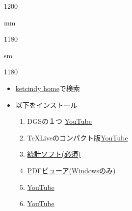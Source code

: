 \documentclass[landscape,10pt]{jarticle}
\newcommand{\slidepage}[1][s]{%
\setcounter{ketpicctra}{18}%
\if#1m \setcounter{ketpicctra}{1}\fi
\hypersetup{linkcolor=black}%

\begin{layer}{118}{0}
\putnotee{122}{-\theketpicctra.05}{\small\thepage/\pageref{pageend}}
\end{layer}\hypersetup{linkcolor=blue}

}
\begin{document}
\begin{layer}{120}{0}
\end{layer}

\def\mainslidetitley{22}
\def\ketcletter{slidecolora}
\def\ketcbox{slidecolorb}
\def\ketdbox{slidecolorc}
\def\ketcframe{slidecolord}
\def\ketcshadow{slidecolore}
\def\ketdshadow{slidecolorf}
\def\slidetitlex{6}
\def\slidetitlesize{1.3}
\def\mketcletter{slidecolori}
\def\mketcbox{yellow}
\def\mketdbox{yellow}
\def\mketcframe{yellow}
\def\mslidetitlex{62}
\def\mslidetitlesize{2}

\color{black}
\Large\bf\boldmath
\addtocounter{page}{-1}





\slidepage[m]



\vspace*{18mm}

\slidepage
\begin{itemize}
\item
\href{https://s-takato.github.io/ketcindyorg/indexj.html}{ketcindy home}で検索\vspace{-2mm}
\item
以下をインストール\vspace{-2mm}
\begin{enumerate}[(1)]
\item
{}DGSの１つ \href{https://www.youtube.com/watch?v=eAdhjGW438I}{YouTube}\vspace{-2mm}
\item
{}TeXLiveのコンパクト版\href{https://www.youtube.com/watch?v=_6zPk-3sAP8}{YouTube}\vspace{-2mm}
\item
{}\href{https://cran.r-project.org}{統計ソフト(必須)}\vspace{-2mm}
\item
{}\href{https://cran.r-project.org}{PDFビューア(Windowsのみ)}\vspace{-2mm}
\item
{}\href{https://www.youtube.com/watch?v=hVRXyeH31SM}{YouTube}\vspace{-2mm}
\item
{}\href{https://www.youtube.com/watch?v=H71sd1FvpIQ}{YouTube}\vspace{-2mm}
\end{enumerate}
\end{itemize}
\end{document}
